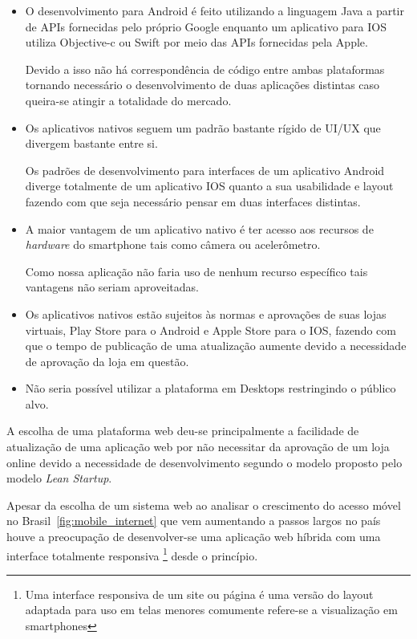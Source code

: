\begin{itemize}
\item O desenvolvimento para Android é feito utilizando a linguagem Java a partir de APIs fornecidas pelo próprio Google enquanto um aplicativo para IOS utiliza Objective-c ou Swift por meio das APIs fornecidas pela Apple.
\par Devido a isso não há correspondência de código entre ambas plataformas tornando necessário o desenvolvimento de duas aplicações distintas caso queira-se atingir a totalidade do mercado.
\item Os aplicativos nativos seguem um padrão bastante rígido de UI/UX que divergem bastante entre si.
\par Os padrões de desenvolvimento para interfaces de um aplicativo Android diverge totalmente de um aplicativo IOS quanto a sua usabilidade e layout fazendo com que seja necessário pensar em duas interfaces distintas.
\item A maior vantagem de um aplicativo nativo é ter acesso aos recursos de \emph{hardware} do smartphone tais como câmera ou acelerômetro.
\par Como nossa aplicação não faria uso de nenhum recurso específico tais vantagens não seriam aproveitadas.
\item Os aplicativos nativos estão sujeitos às normas e aprovações de suas lojas virtuais, Play Store para o Android e Apple Store para o IOS, fazendo com que o tempo de publicação de uma atualização aumente devido a necessidade de aprovação da loja em questão.
\item Não seria possível utilizar a plataforma em Desktops restringindo o público alvo.
\end{itemize}
\par A escolha de uma plataforma web deu-se principalmente a facilidade de atualização de uma aplicação web por não necessitar da aprovação de um loja online devido a necessidade de desenvolvimento segundo o modelo proposto pelo modelo \emph{Lean Startup}.
\par Apesar da escolha de um sistema web ao analisar o crescimento do acesso móvel no Brasil~\ref{fig:mobile_internet} que vem aumentando a passos largos no país houve a preocupação de desenvolver-se uma aplicação web híbrida com uma interface totalmente responsiva \footnote{ Uma interface responsiva de um site ou página é uma versão do layout adaptada para uso em telas menores comumente refere-se a visualização em smartphones} desde o princípio.
